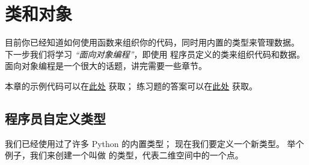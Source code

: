 

\chapter{类和对象}
\label{clobjects}


目前你已经知道如何使用函数来组织你的代码，同时用内置的类型来管理数据。
下一步我们将学习 {\em ``面向对象编程''}，即使用
程序员定义的类来组织代码和数据。
面向对象编程是一个很大的话题，讲完需要一些章节。



本章的示例代码可以在\href{http://thinkpython2.com/code/Point1.py}{此处} 获取；
练习题的答案可以在\href{http://thinkpython2.com/code/Point1_soln.py}{此处} 获取。


\section{程序员自定义类型}
\label{point}
  


我们已经使用过了许多 Python 的内置类型；
现在我们要定义一个新类型。 举个例子，我们来创建一个叫做  的类型，代表二维空间中的一个点。


